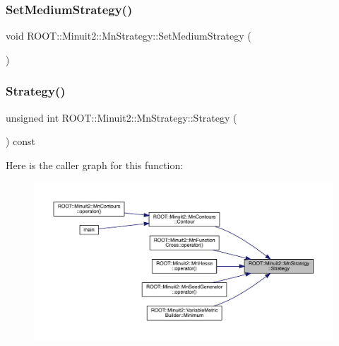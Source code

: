 \subsubsection{\texorpdfstring{SetMediumStrategy()}{SetMediumStrategy()}\hspace{0.1cm}{\footnotesize\ttfamily [2/2]}}
{\footnotesize\ttfamily void R\+O\+O\+T\+::\+Minuit2\+::\+Mn\+Strategy\+::\+Set\+Medium\+Strategy (\begin{DoxyParamCaption}{ }\end{DoxyParamCaption})}

\mbox{\label{classROOT_1_1Minuit2_1_1MnStrategy_a1ff03f5ccec83aa19770d080b2be2334}} 
\subsubsection{\texorpdfstring{Strategy()}{Strategy()}\hspace{0.1cm}{\footnotesize\ttfamily [1/2]}}
{\footnotesize\ttfamily unsigned int R\+O\+O\+T\+::\+Minuit2\+::\+Mn\+Strategy\+::\+Strategy (\begin{DoxyParamCaption}{ }\end{DoxyParamCaption}) const\hspace{0.3cm}{\ttfamily [inline]}}

Here is the caller graph for this function\+:\nopagebreak
\begin{figure}[H]
\begin{center}
\leavevmode
\includegraphics[width=350pt]{da/de4/classROOT_1_1Minuit2_1_1MnStrategy_a1ff03f5ccec83aa19770d080b2be2334_icgraph}
\end{center}
\end{figure}
\mbox{\label{classROOT_1_1Minuit2_1_1MnStrategy_a1ff03f5ccec83aa19770d080b2be2334}} 
